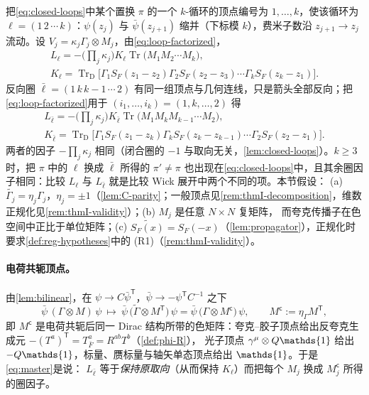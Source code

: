\documentclass[UTF8,a4paper,11pt,fontset=fandol]{ctexart}
\let\amsmathbb\mathbb
\renewcommand{\mathbb}[1]{\ifx1#1\mathds{1}\else\amsmathbb{#1}\fi}
\theoremstyle{cplain}
\theoremstyle{cdefinition}
\theoremstyle{cremark}
\numberwithin{equation}{section}
\DeclareMathOperator{\Tr}{Tr}
\newcommand{\TrD}{\operatorname{Tr}_{\mathrm{D}}}   %
\newcommand{\tp}{\mathsf{T}}                         %
\newcommand{\SF}{S_{F}}                              %
\newcommand{\Cconj}[1]{\widetilde{#1}}              %
\begin{document}
把\cref{eq:closed-loops}中某个置换 $\pi$ 的一个 $k$-循环的顶点编号为 $1,\dots,k$，使该循环为 $\ell=(1\,2\,\cdots\,k)$：$\psi(z_j)$ 与 $\bar\psi(z_{j+1})$
缩并（下标模 $k$），费米子数沿 $z_{j+1}\to z_j$ 流动。设 $V_j=\kappa_j\Gamma_j\otimes M_j$，由\cref{eq:loop-factorized}，
\begin{equation}\label{eq:thmI-L}
\begin{gathered}
L_\ell=-\bigl(\textstyle\prod_j\kappa_j\bigr)K_\ell\Tr\bigl(M_1M_2\cdots M_k\bigr),\\
K_\ell=\TrD\bigl[\Gamma_1\SF(z_1-z_2)\Gamma_2\SF(z_2-z_3)\cdots\Gamma_k\SF(z_k-z_1)\bigr].
\end{gathered}
\end{equation}
反向圈 $\bar\ell=(1\,k\,k-1\,\cdots\,2)$ 有同一组顶点与几何连线，只是箭头全部反向；把\cref{eq:loop-factorized}用于 $(i_1,\dots,i_k)=(1,k,\dots,2)$ 得
\begin{equation}\label{eq:thmI-Lbar}
\begin{gathered}
L_{\bar\ell}=-\bigl(\textstyle\prod_j\kappa_j\bigr)K_{\bar\ell}\Tr\bigl(M_1M_kM_{k-1}\cdots M_2\bigr),\\
K_{\bar\ell}=\TrD\bigl[\Gamma_1\SF(z_1-z_k)\Gamma_k\SF(z_k-z_{k-1})\cdots\Gamma_2\SF(z_2-z_1)\bigr].
\end{gathered}
\end{equation}
两者的因子 $-\prod_j\kappa_j$ 相同（闭合圈的 $-1$ 与取向无关，\cref{lem:closed-loops}）。$k\ge3$ 时，把 $\pi$ 中的 $\ell$ 换成 $\bar\ell$ 所得的 $\pi'\neq\pi$
也出现在\cref{eq:closed-loops}中，且其余圈因子相同：比较 $L_\ell$ 与 $L_{\bar\ell}$ 就是比较 Wick 展开中两个不同的项。本节假设：
(a) $\Cconj{\Gamma_j}=\eta_j\Gamma_j$，$\eta_j=\pm1$（\cref{lem:C-parity}；一般顶点见\cref{rem:thmI-decomposition}，维数正规化见\cref{rem:thmI-validity}）；(b) $M_j$ 是任意 $N\times N$ 复矩阵，
而夸克传播子在色空间中正比于单位矩阵；(c) $\Cconj{\SF(x)}=\SF(-x)$（\cref{lem:propagator}），正规化时要求\cref{def:reg-hypotheses}中的 (R1)（\cref{rem:thmI-validity}）。

\paragraph{电荷共轭顶点。}由\cref{lem:bilinear}，在 $\psi\to C\bar\psi^{\tp}$，$\bar\psi\to-\psi^{\tp}C^{-1}$ 之下
\begin{equation}\label{eq:thmI-vertex-conj}
\bar\psi\,(\Gamma\otimes M)\,\psi\ \longmapsto\ \bar\psi\,\bigl(\Cconj\Gamma\otimes M^{\tp}\bigr)\,\psi=\bar\psi\,\bigl(\Gamma\otimes M^{\mathsf c}\bigr)\,\psi ,
\qquad M^{\mathsf c}:=\eta_\Gamma M^{\tp},
\end{equation}
即 $M^{\mathsf c}$ 是电荷共轭后同一 Dirac 结构所带的色矩阵：夸克--胶子顶点给出反夸克生成元 $-(T^a)^{\tp}=T^a_{\bar F}=R^{ab}T^b$（\cref{def:phi-R}），
光子顶点 $\gamma^\mu\otimes Q\mathbb 1$ 给出 $-Q\mathbb 1$，标量、赝标量与轴矢单态顶点给出 $\mathbb 1$。于是\cref{eq:master}是说：
$L_{\bar\ell}$ 等于\emph{保持原取向}（从而保持 $K_\ell$）而把每个 $M_j$ 换成 $M_j^{\mathsf c}$ 所得的圈因子。
\end{document}
